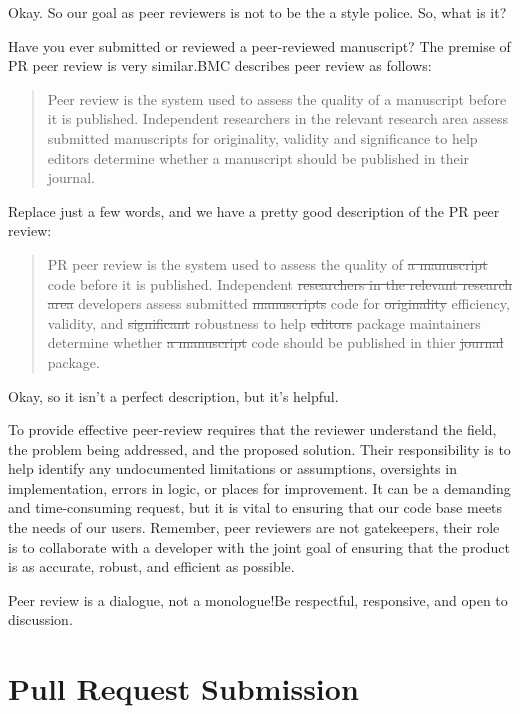 \documentclass[
]{book}
\begin{document}
Okay. So our goal as peer reviewers is not to be the a style police. So, what is it?

Have you ever submitted or reviewed a peer-reviewed manuscript? The premise of PR peer review is very similar.BMC describes peer review as follows:

\begin{quote}
Peer review is the system used to assess the quality of a manuscript before it is published. Independent researchers in the relevant research area assess submitted manuscripts for originality, validity and significance to help editors determine whether a manuscript should be published in their journal.
\end{quote}

Replace just a few words, and we have a pretty good description of the PR peer review:

\begin{quote}
PR peer review is the system used to assess the quality of \st{a manuscript} code before it is published. Independent \st{researchers in the relevant research area} developers assess submitted \st{manuscripts} code for \st{originality} efficiency, validity, and \st{significant} robustness to help \st{editors} package maintainers determine whether \st{a manuscript} code should be published in thier \st{journal} package.
\end{quote}

Okay, so it isn't a perfect description, but it's helpful.

To provide effective peer-review requires that the reviewer understand the field, the problem being addressed, and the proposed solution. Their responsibility is to help identify any undocumented limitations or assumptions, oversights in implementation, errors in logic, or places for improvement. It can be a demanding and time-consuming request, but it is vital to ensuring that our code base meets the needs of our users. Remember, peer reviewers are not gatekeepers, their role is to collaborate with a developer with the joint goal of ensuring that the product is as accurate, robust, and efficient as possible.

Peer review is a dialogue, not a monologue!Be respectful, responsive, and open to discussion.

\hypertarget{pull-request-submission}{%
\section{Pull Request Submission}\label{pull-request-submission}}
\end{document}
